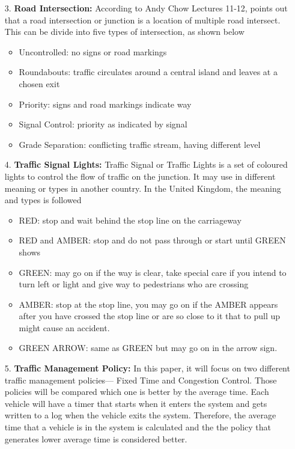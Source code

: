 \documentclass[11pt]{article}
\begin{document}
\begin{itemize}
\begin{center}
		\end{center}  	
		\item[3. ]\textbf{Road Intersection:}	
		According to Andy Chow Lectures 11-12, \cite{Lecture} points out that a road intersection or junction is a location of multiple road intersect. This can be divide into five types of intersection, as shown below
		\begin{itemize}
			\item{} Uncontrolled: no signs or road markings
			\item{} Roundabouts: traffic circulates around a central island and leaves at a chosen exit
			\item{} Priority: signs and road markings indicate way
			\item{} Signal Control: priority as indicated by signal
			\item{} Grade Separation: conflicting traffic stream, having different level
  		\end{itemize}	
		\item[4. ]\textbf{Traffic Signal Lights:}
		Traffic Signal or Traffic Lights is a set of coloured lights to control the flow of traffic on the junction. It may use in different meaning or types in another country. In the United Kingdom, the meaning and types is followed
  		\begin{itemize}
			\item{} RED: stop and wait behind the stop line on the carriageway
			\item{} RED and AMBER: stop and do not pass through or start until GREEN shows
			\item{} GREEN: may go on if the way is clear, take special care if you intend to turn left or light and give way to pedestrians who are crossing
			\item{} AMBER: stop at the stop line, you may go on if the AMBER appears after you have crossed the stop line or are so close to it that to pull up might cause an accident. 
			\item{} GREEN ARROW: same as GREEN but may go on in the arrow sign.
  		\end{itemize}	
		\item[5. ]\textbf{Traffic Management Policy:}
		In this paper, it will focus on two different traffic management policies— Fixed Time and Congestion Control. Those policies will be compared which one is better by the average time. Each vehicle will have a timer that starts when it enters the system and gets written to a log when the vehicle exits the system. Therefore, the average time that a vehicle is in the system is calculated and the the policy that generates lower average time is considered better.

\end{itemize}
\end{document}
